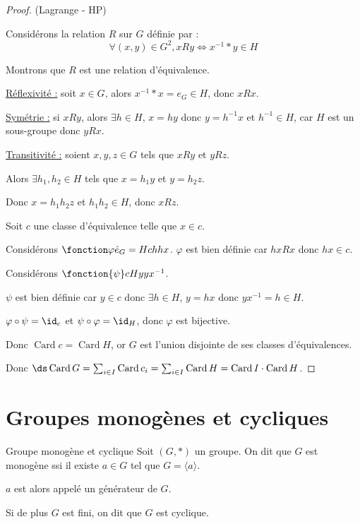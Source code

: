 \avspace {}

\begin{proof}(Lagrange - HP)

    Considérons la relation $R$ sur $G$ définie par :
    \[\forall (x, y) \in G^2, x R y \Leftrightarrow x^{-1} \ast y \in H\]

    Montrons que $R$ est une relation d'équivalence.

    \uline{Réflexivité :}
    soit $x \in G$, alors $x^{-1} \ast x = e_G \in H$, donc $x R x$.
    
    \uline{Symétrie :}
    si $x R y$, alors $\exists h \in H$, $x = hy$ donc $y = h^{-1} x$ 
    et $h^{-1} \in H$, car $H$ est un sous-groupe donc $y R x$.

    \uline{Transitivité :}
    soient $x, y, z \in G$ tels que $x R y$ et $y R z$.

    Alors $\exists h_1, h_2 \in H$ tels que $x = h_1 y$ et $y = h_2 z$.

    Donc $x = h_1 h_2 z$ et $h_1 h_2 \in H$, donc $x R z$.
    
    \lvspace Soit $c$ une classe d'équivalence telle que $x \in c$. 

    Considérons $\fonction \varphi {\hat e_G = H}c h {h x}$. 
    $\varphi$ est bien définie car $hx R x$ donc $hx \in c$. 

    Considérons $\fonction{\psi} c H {y} {yx^{-1}}$.

    $\psi$ est bien définie car $y \in c$ donc $\exists h \in H$, $y = hx$ donc $yx^{-1} = h \in H$.

    $\varphi \circ \psi = \id_c$ et $\psi \circ \varphi = \id_H$, donc $\varphi$ est bijective. 

    Donc $\operatorname{Card} c = \operatorname{Card} H$, or $G$ est l'union disjointe de ses classes d'équivalences.

    Donc $\ds \operatorname{Card} G = \sum_{i \in I} \operatorname{Card} c_i = \sum_{i \in I} \operatorname{Card} H = \operatorname{Card} I \cdot \operatorname{Card} H$.
\end{proof}

\section{Groupes monogènes et cycliques}

\begin{definition}{Groupe monogène et cyclique}{}
    Soit $(G, \ast)$ un groupe. On dit que $G$ est monogène ssi il existe $a \in G$ tel que 
    $G = \langle a \rangle$. 

    $a$ est alors appelé un générateur de $G$.

    Si de plus $G$ est fini, on dit que $G$ est cyclique.
\end{definition}

